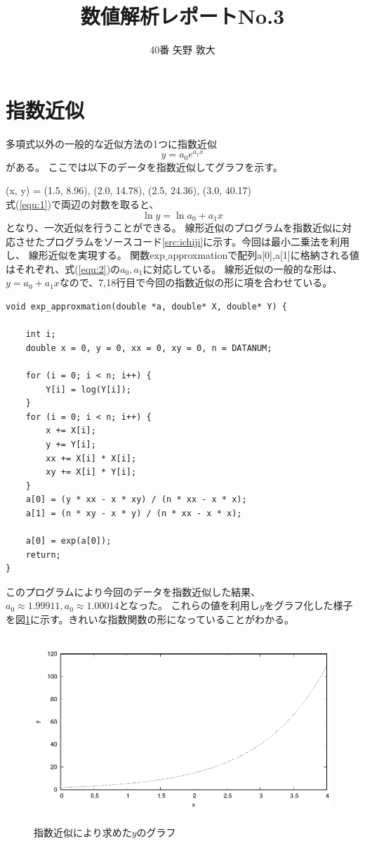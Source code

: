 \documentclass[titlepage]{jsarticle}
\begin{document}
\title{数値解析レポートNo.3}
\author{40番 矢野 敦大}
\date{}
\maketitle

\section{指数近似}
	多項式以外の一般的な近似方法の1つに指数近似
	\begin{equation}
		y = a_0e^{a_1x}
		\label{equ:1}
	\end{equation}
	がある。
	ここでは以下のデータを指数近似してグラフを示す。
	
	(x, y) = (1.5, 8.96), (2.0, 14.78), (2.5, 24.36), (3.0, 40.17)\\
	式(\ref{equ:1})で両辺の対数を取ると、
	\begin{equation}
		\ln y = \ln a_0 + a_1x
		\label{equ:2}
	\end{equation}
	となり、一次近似を行うことができる。
	線形近似のプログラムを指数近似に対応させたプログラムをソースコード\ref{src:ichiji}に示す。今回は最小二乗法を利用し、
	線形近似を実現する。
	関数exp$\_$approxmationで配列a[0],a[1]に格納される値はそれぞれ、式(\ref{equ:2})の$a_0,a_1$に対応している。	
	線形近似の一般的な形は、$y = a_0 + a_1 x$なので、7,18行目で今回の指数近似の形に項を合わせている。
\begin{lstlisting}[caption=作成した指数近似を行うプログラム\cite{wiki},label=src:ichiji]
void exp_approxmation(double *a, double* X, double* Y) {
	
	int i;
	double x = 0, y = 0, xx = 0, xy = 0, n = DATANUM;

	for (i = 0; i < n; i++) {
		Y[i] = log(Y[i]);
	}
	for (i = 0; i < n; i++) {
		x += X[i];
		y += Y[i];
		xx += X[i] * X[i];
		xy += X[i] * Y[i];
	}
	a[0] = (y * xx - x * xy) / (n * xx - x * x);
	a[1] = (n * xy - x * y) / (n * xx - x * x);

	a[0] = exp(a[0]);
	return;
}
\end{lstlisting}
	このプログラムにより今回のデータを指数近似した結果、$a_0\approx 1.99911,a_0\approx 1.00014$となった。
	これらの値を利用し$y$をグラフ化した様子を図\ref{fig:1}に示す。きれいな指数関数の形になっていることがわかる。

	\begin{figure}[]
		\centering
		\includegraphics[height=7cm]{1/res.eps}
		\caption{指数近似により求めた$y$のグラフ}
		\label{fig:1}
	\end{figure}
\end{document}
